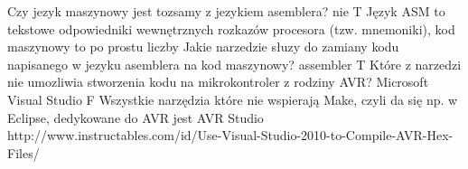 \answer
{Czy jezyk maszynowy jest tozsamy z jezykiem asemblera? }
{nie}
{T}
{}
{Język ASM to tekstowe odpowiedniki wewnętrznych rozkazów procesora (tzw. mnemoniki), kod maszynowy to po prostu liczby}
\answer
{Jakie narzedzie słuzy do zamiany kodu napisanego w jezyku asemblera na kod maszynowy? }
{assembler}
{T}
{}
{}
\answer
{Które z narzedzi nie umozliwia stworzenia kodu na mikrokontroler z rodziny AVR?}
{Microsoft Visual Studio
}
{F}
{Wszystkie narzędzia które nie wspierają Make, czyli da się np. w Eclipse, dedykowane do AVR jest AVR Studio}
{http://www.instructables.com/id/Use-Visual-Studio-2010-to-Compile-AVR-Hex-Files/}
